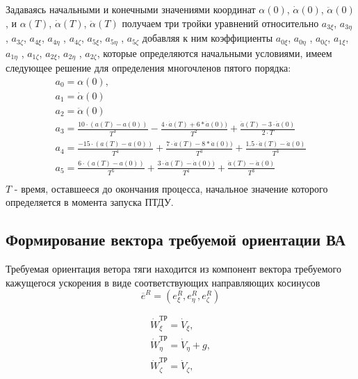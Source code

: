 Задаваясь начальными и конечными значениями координат $\alpha (0)$, $\dot{\alpha} (0)$, $\ddot{\alpha} (0)$, и $\alpha (T)$, $\dot{\alpha} (T)$, $\ddot{\alpha} (T)$ получаем три тройки уравнений относительно $a_{3 \xi}$, $a_{3 \eta}$ , $a_{3 \zeta}$, $a_{4 \xi}$, $a_{4 \eta}$ , $a_{4 \zeta}$, $a_{5 \xi}$, $a_{5 \eta}$ , $a_{5 \zeta}$ добавляя к ним коэффициенты $a_{0 \xi}$, $a_{0 \eta}$ , $a_{0 \zeta}$, $a_{1 \xi}$, $a_{1 \eta}$ , $a_{1 \zeta}$, $a_{2 \xi}$, $a_{2 \eta}$ , $a_{2 \zeta}$, которые определяются начальными условиями, имеем следующее решение для определения многочленов пятого порядка:
\begin{equation}
	\begin{gathered}
		a_0 = \alpha (0), \\
		a_1 = \dot{\alpha} (0) \\
		a_2 = \ddot{\alpha} (0) \\
		a_3 = \frac{10 \cdot ( a(T) - a(0) ) }{T^3} - \frac{4 \cdot \dot{a}(T) + 6 * \dot{a}(0) ) }{T^2} +  \frac{ \ddot{a}(T) - 3 \cdot \ddot{a}(0) }{2 \cdot T}\\
		a_4 = \frac{-15 \cdot ( a(T) - a(0) ) }{T^4} + \frac{7 \cdot \dot{a}(T) - 8 * \dot{a}(0) ) }{T^3} +  \frac{ 1.5 \cdot \ddot{a}(T) -  \ddot{a}(0) }{T^3} \\
		a_5 = \frac{6 \cdot ( a(T) - a(0) ) }{T^5} + \frac{3 \cdot \dot{a}(T) - \dot{a}(0) ) }{T^4} +  \frac{\ddot{a}(T) -\ddot{a}(0) }{T^3} \\
	\end{gathered}
\end{equation}
$T$ - время, оставшееся до окончания процесса, начальное значение которого определяется в момента запуска ПТДУ.
\clearpage

\subsection{Формирование вектора требуемой ориентации ВА}
Требуемая ориентация ветора тяги находится из компонент вектора требуемого кажущегося ускорения в виде соответствующих направляющих косинусов
\begin{equation}
	\overline{e}^R = (e^{R}_\xi, e^{R}_\eta, e^{R}_\zeta)
\end{equation}

\begin{equation}
	\begin{gathered}
		\dot{W}^\text{ТР}_\xi = \dot{V}_\xi, \\
		\dot{W}^\text{ТР}_\eta = \dot{V}_\eta + g, \\
		\dot{W}^\text{ТР}_\zeta = \dot{V}_\zeta,
	\end{gathered}
\end{equation}

